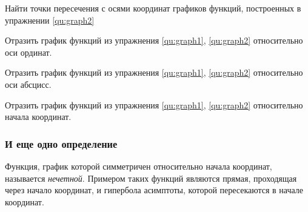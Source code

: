 \documentclass[algebra,twocolumn]{pum}
\begin{document}
\begin{exercises}
\begin{question}
  \end{question}
  \begin{question}
    Найти точки пересечения с осями координат графиков функций, построенных в упражнении \ref{qu:graph2} 
  \end{question}
  \begin{question}
    Отразить график функций из упражнения \ref{qu:graph1}, \ref{qu:graph2} относительно оси ординат.
  \end{question}
  \begin{question}
    Отразить график функций из упражнения \ref{qu:graph1}, \ref{qu:graph2} относительно оси абсцисс.
  \end{question}
  \begin{question}
    Отразить график функций из упражнения \ref{qu:graph1}, \ref{qu:graph2} относительно начала координат.
  \end{question}
\end{exercises}

\bigskip
\subsubsection*{И еще одно определение}
Функция, график которой симметричен относительно начала координат, называется \emph{нечетной}. Примером таких функций являются прямая, проходящая через начало координат, и гипербола асимптоты, которой пересекаются в начале координат.
\end{document}
